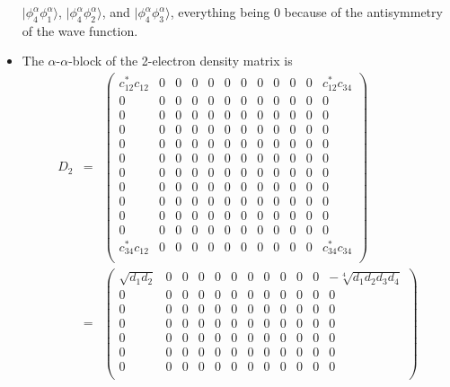 \documentclass[aip,graphicx]{revtex4-1}
\begin{document}
\begin{itemize}
         $|\phi^\alpha_4\phi^\alpha_1\rangle$, $|\phi^\alpha_4\phi^\alpha_2\rangle$,
         and $|\phi^\alpha_4\phi^\alpha_3\rangle$, everything being $0$ because of
         the antisymmetry of the wave function.
\item The $\alpha$-$\alpha$-block of the 2-electron density matrix is
         \begin{eqnarray}
         D_2 &=&
         \begin{pmatrix}
         c_{12}^*c_{12} & 0 & 0 & 0 & 0 & 0 & 0 & 0 & 0 & 0 & 0 & c_{12}^*c_{34} \\
         0 & 0 & 0 & 0 & 0 & 0 & 0 & 0 & 0 & 0 & 0 & 0 \\
         0 & 0 & 0 & 0 & 0 & 0 & 0 & 0 & 0 & 0 & 0 & 0 \\
         0 & 0 & 0 & 0 & 0 & 0 & 0 & 0 & 0 & 0 & 0 & 0 \\
         0 & 0 & 0 & 0 & 0 & 0 & 0 & 0 & 0 & 0 & 0 & 0 \\
         0 & 0 & 0 & 0 & 0 & 0 & 0 & 0 & 0 & 0 & 0 & 0 \\
         0 & 0 & 0 & 0 & 0 & 0 & 0 & 0 & 0 & 0 & 0 & 0 \\
         0 & 0 & 0 & 0 & 0 & 0 & 0 & 0 & 0 & 0 & 0 & 0 \\
         0 & 0 & 0 & 0 & 0 & 0 & 0 & 0 & 0 & 0 & 0 & 0  \\
         0 & 0 & 0 & 0 & 0 & 0 & 0 & 0 & 0 & 0 & 0 & 0  \\
         0 & 0 & 0 & 0 & 0 & 0 & 0 & 0 & 0 & 0 & 0 & 0  \\
         c_{34}^*c_{12} & 0 & 0 & 0 & 0 & 0 & 0 & 0 & 0 & 0 & 0 &  c_{34}^*c_{34} \\
         \end{pmatrix} \\
         \label{Eq:D2aa-wfn}
         &=&
         \begin{pmatrix}
         \sqrt{d_{1}d_{2}} & 0 & 0 & 0 & 0 & 0 & 0 & 0 & 0 & 0 & 0 & -\sqrt[4]{d_{1}d_{2}d_{3}d_{4}} \\
         0 & 0 & 0 & 0 & 0 & 0 & 0 & 0 & 0 & 0 & 0 & 0 \\
         0 & 0 & 0 & 0 & 0 & 0 & 0 & 0 & 0 & 0 & 0 & 0 \\
         0 & 0 & 0 & 0 & 0 & 0 & 0 & 0 & 0 & 0 & 0 & 0 \\
         0 & 0 & 0 & 0 & 0 & 0 & 0 & 0 & 0 & 0 & 0 & 0 \\
         0 & 0 & 0 & 0 & 0 & 0 & 0 & 0 & 0 & 0 & 0 & 0 \\
         0 & 0 & 0 & 0 & 0 & 0 & 0 & 0 & 0 & 0 & 0 & 0 \\

\end{pmatrix}
\end{eqnarray}
\end{itemize}
\end{document}
